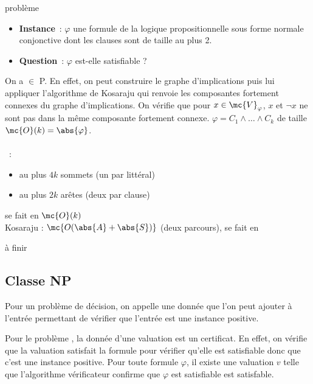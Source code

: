 \begin{exemple}{}{problème \deuxsat}
    \begin{itemize}
        \item \textbf{Instance}~: $\varphi$ une formule de la logique propositionnelle sous forme normale conjonctive dont les clauses sont de taille au plus 2.
        \item \textbf{Question}~: $\varphi$ est-elle satisfiable ?
    \end{itemize}
    On a \deuxsat $\in$ P. En effet, on peut construire le graphe d'implications puis lui appliquer l'algorithme de Kosaraju qui renvoie les composantes fortement connexes du graphe d'implications. On vérifie que pour $x \in \mc{V}_\varphi$, $x$ et $\lnot x$ ne sont pas dans la même composante fortement connexe. $\varphi = C_1 \wedge \dots \wedge C_k$ de taille $\mc{O}(k) = \abs{\varphi}$.\\\\
    ~:
    \begin{itemize}
        \item au plus $4k$ sommets (un par littéral)
        \item au plus $2k$ arêtes (deux par clause)
    \end{itemize}
    se fait en $\mc{O}(k)$\\
    Kosaraju  : $\mc{O(\abs{A} + \abs{S})}$ (deux parcours), se fait en 

    à finir
\end{exemple}

\subsection{Classe NP}

\begin{definition}{}{}
    Pour un problème de décision, on appelle  une donnée que l'on peut ajouter à l'entrée permettant de vérifier que l'entrée est une instance positive.
\end{definition}

\begin{exemple}{}{}
    Pour le problème \sat, la donnée d'une valuation est un certificat. En effet, on vérifie que la valuation satisfait la formule pour vérifier qu'elle est satisfiable donc que c'est une instance positive.
    Pour toute formule $\varphi$, il existe une valuation $v$ telle que l'algorithme vérificateur confirme que $\varphi$ est satisfiable est satisfable.
\end{exemple}

